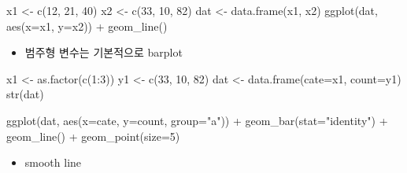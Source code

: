\documentclass[
]{book}
\newenvironment{Shaded}{\begin{snugshade}}{\end{snugshade}}
\newcommand{\AttributeTok}[1]{\textcolor[rgb]{0.77,0.63,0.00}{#1}}
\newcommand{\DecValTok}[1]{\textcolor[rgb]{0.00,0.00,0.81}{#1}}
\newcommand{\FunctionTok}[1]{\textcolor[rgb]{0.00,0.00,0.00}{#1}}
\newcommand{\NormalTok}[1]{#1}
\newcommand{\OtherTok}[1]{\textcolor[rgb]{0.56,0.35,0.01}{#1}}
\newcommand{\SpecialCharTok}[1]{\textcolor[rgb]{0.00,0.00,0.00}{#1}}
\newcommand{\StringTok}[1]{\textcolor[rgb]{0.31,0.60,0.02}{#1}}
\providecommand{\tightlist}{%
  \setlength{\itemsep}{0pt}\setlength{\parskip}{0pt}}
\begin{document}
\begin{Shaded}
\begin{Highlighting}[]
\NormalTok{x1 }\OtherTok{\textless{}{-}} \FunctionTok{c}\NormalTok{(}\DecValTok{12}\NormalTok{, }\DecValTok{21}\NormalTok{, }\DecValTok{40}\NormalTok{)}
\NormalTok{x2 }\OtherTok{\textless{}{-}} \FunctionTok{c}\NormalTok{(}\DecValTok{33}\NormalTok{, }\DecValTok{10}\NormalTok{, }\DecValTok{82}\NormalTok{)}
\NormalTok{dat }\OtherTok{\textless{}{-}} \FunctionTok{data.frame}\NormalTok{(x1, x2)}
\FunctionTok{ggplot}\NormalTok{(dat, }\FunctionTok{aes}\NormalTok{(}\AttributeTok{x=}\NormalTok{x1, }\AttributeTok{y=}\NormalTok{x2)) }\SpecialCharTok{+}
  \FunctionTok{geom\_line}\NormalTok{()}
\end{Highlighting}
\end{Shaded}

\begin{itemize}
\tightlist
\item
  범주형 변수는 기본적으로 barplot
\end{itemize}

\begin{Shaded}
\begin{Highlighting}[]
\NormalTok{x1 }\OtherTok{\textless{}{-}} \FunctionTok{as.factor}\NormalTok{(}\FunctionTok{c}\NormalTok{(}\DecValTok{1}\SpecialCharTok{:}\DecValTok{3}\NormalTok{))}
\NormalTok{y1 }\OtherTok{\textless{}{-}} \FunctionTok{c}\NormalTok{(}\DecValTok{33}\NormalTok{, }\DecValTok{10}\NormalTok{, }\DecValTok{82}\NormalTok{)}
\NormalTok{dat }\OtherTok{\textless{}{-}} \FunctionTok{data.frame}\NormalTok{(}\AttributeTok{cate=}\NormalTok{x1, }\AttributeTok{count=}\NormalTok{y1)}
\FunctionTok{str}\NormalTok{(dat)}

\FunctionTok{ggplot}\NormalTok{(dat, }\FunctionTok{aes}\NormalTok{(}\AttributeTok{x=}\NormalTok{cate, }\AttributeTok{y=}\NormalTok{count, }\AttributeTok{group=}\StringTok{"a"}\NormalTok{)) }\SpecialCharTok{+}
  \FunctionTok{geom\_bar}\NormalTok{(}\AttributeTok{stat=}\StringTok{"identity"}\NormalTok{) }\SpecialCharTok{+}
  \FunctionTok{geom\_line}\NormalTok{() }\SpecialCharTok{+}
  \FunctionTok{geom\_point}\NormalTok{(}\AttributeTok{size=}\DecValTok{5}\NormalTok{)}
\end{Highlighting}
\end{Shaded}

\begin{itemize}
\tightlist
\item
  smooth line
\end{itemize}
\end{document}
